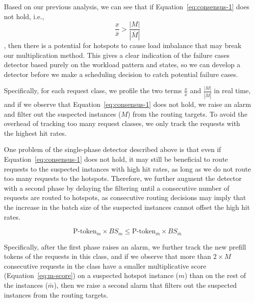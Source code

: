 Based on our previous analysis, we can see that if Equation~\ref{eq:consensus-1} 
does not hold, i.e., \[ \frac{x}{\bar{x}} > \frac{|M|}{|\overline{M}|}  \], 
then there is a potential for {\kvcache} hotspots to cause load imbalance
that may break our multiplication method. 
This gives a clear indication of the failure cases detector based purely on the workload pattern and {\kvcache} states, 
so we can develop a detector before we make a scheduling decision to catch potential failure cases. 

Specifically, for each request class, we profile the two terms \(\frac{x}{\bar{x}}\) and \(\frac{|M|}{|\overline{M}|}\) in real time,
and if we observe that Equation~\ref{eq:consensus-1} does not hold,
we raise an alarm and filter out the suspected instances (\(M\)) from the routing targets.
To avoid the overhead of tracking too many request classes, we only track the requests with the highest {\kvcache} hit rates.

One problem of the single-phase detector described above is that
even if Equation~\ref{eq:consensus-1} does not hold,
it may still be beneficial to route requests to the suspected instances with high {\kvcache} hit rates,
as long as we do not route too many requests to the hotspots.
Therefore, we further augment the detector with a second phase
by delaying the filtering until a consecutive number of requests are routed to hotspots,
as consecutive routing decisions may imply that the increase in the batch size of the suspected instances cannot offset the high {\kvcache} hit rates.

\begin{equation}
  \text{P-token}_m \times BS_m \leq \text{P-token}_{\bar{m}} \times BS_{\bar{m}}
  \label{eq:m-score}
\end{equation}

Specifically, after the first phase raises an alarm, we further track the new prefill tokens of the requests in this class,
and if we observe that more than \(2 \times M\) consecutive requests in the class have a smaller multiplicative score (Equation~\ref{eq:m-score}) on a suspected hotspot instance ($m$)
than on the rest of the instances ($\bar{m}$),
then we raise a second alarm that filters out the suspected instances from the routing targets.

